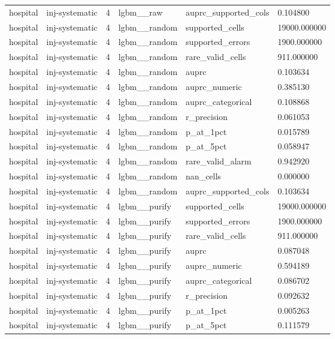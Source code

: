 \begin{tabular}{llllll}
hospital & inj-systematic & 4 & lgbm\_\_raw & auprc\_supported\_cols & 0.104800 \\
hospital & inj-systematic & 4 & lgbm\_\_random & supported\_cells & 19000.000000 \\
hospital & inj-systematic & 4 & lgbm\_\_random & supported\_errors & 1900.000000 \\
hospital & inj-systematic & 4 & lgbm\_\_random & rare\_valid\_cells & 911.000000 \\
hospital & inj-systematic & 4 & lgbm\_\_random & auprc & 0.103634 \\
hospital & inj-systematic & 4 & lgbm\_\_random & auprc\_numeric & 0.385130 \\
hospital & inj-systematic & 4 & lgbm\_\_random & auprc\_categorical & 0.108868 \\
hospital & inj-systematic & 4 & lgbm\_\_random & r\_precision & 0.061053 \\
hospital & inj-systematic & 4 & lgbm\_\_random & p\_at\_1pct & 0.015789 \\
hospital & inj-systematic & 4 & lgbm\_\_random & p\_at\_5pct & 0.058947 \\
hospital & inj-systematic & 4 & lgbm\_\_random & rare\_valid\_alarm & 0.942920 \\
hospital & inj-systematic & 4 & lgbm\_\_random & nan\_cells & 0.000000 \\
hospital & inj-systematic & 4 & lgbm\_\_random & auprc\_supported\_cols & 0.103634 \\
hospital & inj-systematic & 4 & lgbm\_\_purify & supported\_cells & 19000.000000 \\
hospital & inj-systematic & 4 & lgbm\_\_purify & supported\_errors & 1900.000000 \\
hospital & inj-systematic & 4 & lgbm\_\_purify & rare\_valid\_cells & 911.000000 \\
hospital & inj-systematic & 4 & lgbm\_\_purify & auprc & 0.087048 \\
hospital & inj-systematic & 4 & lgbm\_\_purify & auprc\_numeric & 0.594189 \\
hospital & inj-systematic & 4 & lgbm\_\_purify & auprc\_categorical & 0.086702 \\
hospital & inj-systematic & 4 & lgbm\_\_purify & r\_precision & 0.092632 \\
hospital & inj-systematic & 4 & lgbm\_\_purify & p\_at\_1pct & 0.005263 \\
hospital & inj-systematic & 4 & lgbm\_\_purify & p\_at\_5pct & 0.111579 \\

\end{tabular}

